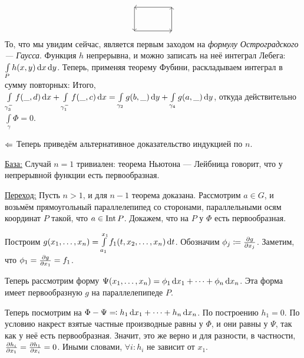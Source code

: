 \documentclass[a4paper]{report}
\begin{document}
{{\[\begin{tikzpicture}
              \draw[->] (0,0) -- (1.6, 0);
              \draw[->] (1.6,0) -- (1.6, 1);
              \draw[->] (1.6,1) -- (0, 1);
              \draw[->] (0,1) -- (0, 0);
        \end{tikzpicture}\]
        То, что мы увидим сейчас, является первым заходом на \emph{формулу Остроградского --- Гаусса}.
        Функция $h$ непрерывна, и можно записать на неё интеграл Лебега:  $\int\limits_{P}h(x, y)\operatorname{d}\! x \operatorname{d}\! y$. %
        Теперь, применяя теорему Фубини, раскладываем интеграл в сумму повторных:
        Итого, $\int\limits_{\gamma_3^-}f(\_, d)\operatorname{d}\! x + \int\limits_{\gamma_1^-}f(\_, c)\operatorname{d}\! x = \int\limits_{\gamma_2}g(b, \_)\operatorname{d}\! y + \int\limits_{\gamma_4}g(a, \_)\operatorname{d}\! y$, откуда действительно $\int\limits_{\gamma}\Phi = 0$.
    \item[$\Leftarrow$] Теперь приведём альтернативное доказательство индукцией по $n$.

    \underline{База:} Случай $n = 1$ тривиален: теорема Ньютона --- Лейбница говорит, что у непрерывной функции есть первообразная.

    \underline{Переход:} Пусть $n > 1$, и для $n - 1$ теорема доказана.
    Рассмотрим $a \in G$, и возьмём прямоугольный параллелепипед со сторонами, параллельными осям координат $P$ такой, что $a \in \operatorname{Int} P$.
        Докажем, что на $P$ у $\Phi$ есть первообразная.

    Построим $g(x_1, \dots, x_n) = \int\limits_{a_1}^{x_1}f_1(t, x_2, \dots, x_n)\operatorname{d}\! t$. Обозначим $\phi_j \coloneqq \frac{\partial g}{\partial x_j}$.
        Заметим, что $\phi_1 = \frac{\partial g}{\partial x_1} = f_1$.

    Теперь рассмотрим форму $\Psi(x_1, \dots, x_n) = \phi_1 \operatorname{d}\! x_1 + \dots + \phi_n \operatorname{d}\! x_n$.
        Эта форма имеет первообразную $g$ на параллелепипеде $P$.

    Теперь посмотрим на $\Phi - \Psi \eqqcolon h_1 \operatorname{d}\! x_1 + \dots + h_n \operatorname{d}\! x_n$.
        По построению $h_1 = 0$.
        По условию накрест взятые частные производные равны у $\Phi$, и они равны у $\Psi$, так как у неё есть первообразная.
    Значит, это же верно и для разности, в частности, $\frac{\partial h_i}{\partial x_1} = \frac{\partial h_1}{\partial x_i} = 0$.
        Иными словами, $\forall i: h_i$ не зависит от $x_1$.

}}
\end{document}
